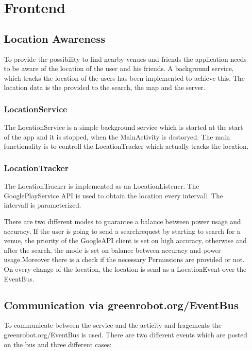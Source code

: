 \section{Frontend}
\label{sec:frontend}

\subsection{Location Awareness}

To provide the possibility to find nearby venues and friends the application needs to be aware of the location of the user and his friends. A background service, which tracks the location of the users has been implemented to achieve this. The location data is the provided to the search, the map and the server.

\subsubsection{LocationService}
The LocationService is a simple background service which is started at the start of the app and it is stopped, when the MainActivity is destoryed. The main functionality is to controll the LocationTracker which actually tracks the location.

\subsubsection{LocationTracker}
The LocationTracker is implemented as an LocationListener. The GooglePlayService API is used to obtain the location every intervall. The intervall is parameterized.

There are two different modes to guarantee a balance between power usage and accuracy. If the user is going to send a searchrequest by starting to search for a venue, the priority of the GoogleAPI client is set on high accuracy, otherwise and after the search, the mode is set on balance between accuracy and power usage.Moreover there is a check if the necessary Permissions are provided or not. On every change of the location, the location is send as a LocationEvent over the EventBus. 

\subsection{Communication via greenrobot.org/EventBus}

To communicate between the service and the acticity and fragements the greenrobot.org/EventBus is used. There are two different events which are posted on the bus and three different cases:


